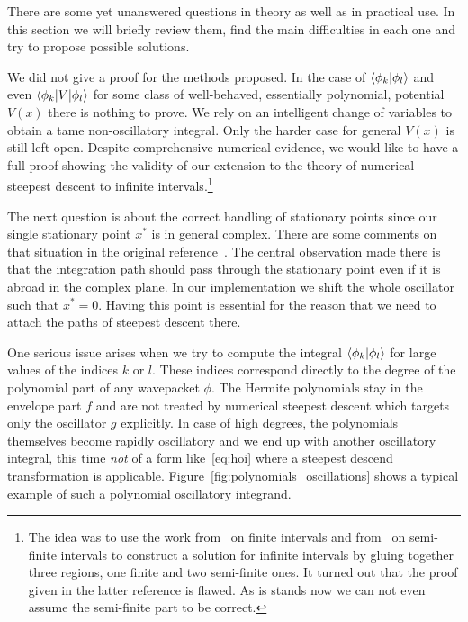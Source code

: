 \documentclass[a4paper,10pt]{article}
\begin{document}
There are some yet unanswered questions in theory as well as in practical use.
In this section we will briefly review them, find the main difficulties
in each one and try to propose possible solutions.

We did not give a proof for the methods proposed.
In the case of $\braket{\phi_k | \phi_l}$ and even $\braket{\phi_k | V | \phi_l}$
for some class of well-behaved, essentially polynomial, potential $V(x)$ there is
nothing to prove. We rely on an intelligent change of variables to obtain a tame
non-oscillatory integral. Only the harder case for general $V(x)$ is still left open.
Despite comprehensive numerical evidence, we would like to have a full proof showing the
validity of our extension to the theory of numerical steepest descent to infinite
intervals.\footnote{The idea was to use the work from~\cite{HV_hoq}
on finite intervals and from~\cite{H_nsd_sii} on semi-finite intervals
to construct a solution for infinite intervals by gluing together three regions,
one finite and two semi-finite ones. It turned out that the proof
given in the latter reference is flawed. As is stands now we can not even assume
the semi-finite part to be correct.}

The next question is about the correct handling of stationary points since our
single stationary point $x^{*}$ is in general complex. There are some comments on
that situation in the original reference~\cite{HV_hoq}. The central observation made
there is that the integration path should pass through the stationary point even if
it is abroad in the complex plane. In our implementation we shift the whole oscillator
such that $x^{*} = 0$. Having this point is essential for the reason that we need to
attach the paths of steepest descent there.

One serious issue arises when we try to compute the integral $\braket{\phi_k|\phi_l}$
for large values of the indices $k$ or $l$. These indices correspond directly to the
degree of the polynomial part of any wavepacket $\phi$. The Hermite polynomials
stay in the envelope part $f$ and are not treated by numerical steepest descent which
targets only the oscillator $g$ explicitly. In case of high degrees, the polynomials
themselves become rapidly oscillatory and we end up with another oscillatory integral,
this time \emph{not} of a form like~\eqref{eq:hoi} where a steepest descend transformation
is applicable. Figure~\ref{fig:polynomials_oscillations} shows a typical example of
such a polynomial oscillatory integrand.
\end{document}
